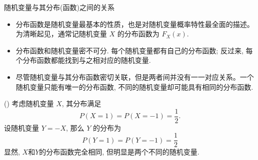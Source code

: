 \begin{frame}{随机变量与其分布(函数)之间的关系}
\begin{itemize}[<+-|alert@+>]
	\item 分布函数是随机变量最基本的性质，也是对随机变量概率特性最全面的描述。为清晰起见，通常记随机变量 $X$ 的分布函数为 $F_{X}(x)$.
	\item 分布函数和随机变量密不可分. 每个随机变量都有自己的分布函数; 反过来, 每个分布函数都能找到与之相对应的随机变量.
	\item 尽管随机变量与其分布函数密切关联，但是两者间并没有一一对应关系。一个随机变量只能有唯一的分布函数, 不同的随机变量却可能具有相同的分布函数.

\end{itemize}
\pause
\begin{exam}
  () 考虑随机变量 $X$, 其分布满足
	\[
	P(X=1)=P(X=-1)=\frac{1}{2}.
	\]\pause
	设随机变量 $Y=-X$, 那么 $Y$ 的分布为
	\[
	P(Y=1)=P(Y=-1)=\frac{1}{2}
	\]\pause
	显然, $X$和$Y$的分布函数完全相同, 但明显是两个不同的随机变量.
\end{exam}


\end{frame}


